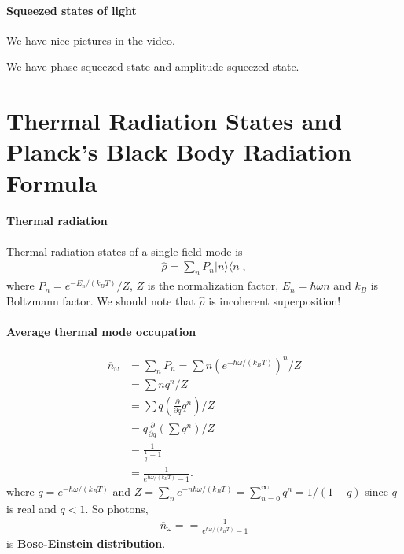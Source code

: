 \documentclass[../../note.tex]{subfiles}
\begin{document}
\paragraph{Squeezed states of light}
We have nice pictures in the video.

We have phase squeezed state and amplitude squeezed state.

\section{Thermal Radiation States and Planck's Black Body Radiation Formula}
\begin{definition}
    
\end{definition}

\paragraph*{Thermal radiation}
Thermal radiation states of a single field mode is
\begin{align}
    \hat{\rho} = \sum_n P_n \vert n \rangle \langle n \vert,
\end{align}
where $P_n = e^{-E_n/(k_B T)}/Z$, $Z$ is the normalization factor, $E_n = \hbar \omega n$ and $k_B$ is Boltzmann factor. We should note that $\hat{\rho}$ is incoherent superposition!

\paragraph*{Average thermal mode occupation}
\begin{align}
    \overline{n}_{\omega} 
    &= \sum_n P_n = \sum n \left(e^{-\hbar \omega /(k_B T)}\right)^n /Z \\
    &=\sum n q^n /Z \\
    &= \sum q \left(\frac{\partial}{\partial q} q^n \right) / Z \\
    &= q \frac{\partial}{\partial q} \left(\sum q^n \right) / Z \\
    &= \frac{1}{\frac{1}{q} - 1} \\
    &= \frac{1}{e^{\hbar \omega /(k_B T)} - 1}.
\end{align}
where $q = e^{-\hbar \omega /(k_B T)}$ and $Z = \sum_n e^{-n \hbar \omega/(k_B T)} = \sum_{n=0}^{\infty} q^n = 1/(1-q)$ since $q$ is real and $q < 1$.
So photons,
\begin{align}
    \overline{n}_{\omega} = = \frac{1}{e^{\hbar \omega /(k_B T)} - 1}
\end{align}
is \textbf{Bose-Einstein distribution}.
\end{document}
